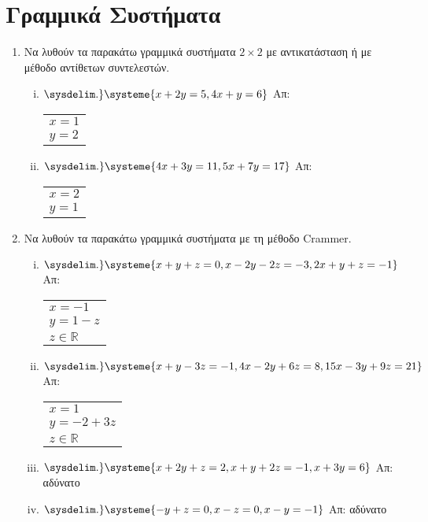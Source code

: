 


\usepackage{systeme}

\pagestyle{askhseis}


\setlength{\itemsep}{\baselineskip}




\section*{Γραμμικά Συστήματα}

\begin{enumerate}

  \item Να λυθούν τα παρακάτω γραμμικά συστήματα $ 2 \times 2 $ με αντικατάσταση ή με 
    μέθοδο αντίθετων συντελεστών.

    \begin{enumerate}[i)]
      \item $ 
      \sysdelim.\}
      \systeme{
        x + 2y = 5, 
        4x + y = 6
      } $ 
      \hfill Απ: 
      \begin{tabular}{l}  
        $x=1 $ \\ 
        $y=2 $ 
      \end{tabular}

    \item $ 
    \sysdelim.\}
    \systeme{
      4x+3y=11,
      5x+7y=17
    } $ 
    \hfill Απ: 
    \begin{tabular}{l}  
      $x=2 $ \\ 
      $y=1 $ 
    \end{tabular}
\end{enumerate}

  \item Να λυθούν τα παρακάτω γραμμικά συστήματα με τη μέθοδο Crammer.

    \begin{enumerate}[i)]
      \item $ 
      \sysdelim.\}
      \systeme{
        x+y+z=0,
        x-2y-2z=-3,
        2x+y+z=-1
      } $ 
      \hfill Απ: \begin{tabular}{l}  
        $x=-1 $ \\ 
        $ y=1-z $ \\
        $z \in \mathbb{R}  $
      \end{tabular}

    \item $ 
    \sysdelim.\}
    \systeme{
      x+y-3z=-1,
      4x-2y+6z=8,
      15x-3y+9z=21
    } $ 
    \hfill Απ: \begin{tabular}{l}  
      $x=1 $ \\ 
      $ y=-2+3z $ \\
      $z \in \mathbb{R}  $
    \end{tabular}

  \item $ 
  \sysdelim.\}
  \systeme{
    x+2y+z=2,
    x+y+2z=-1,
    x+3y=6
  } $ 
  \hfill Απ: αδύνατο 

\item $ 
\sysdelim.\}
\systeme{
  -y+z=0,
  x-z=0,
  x-y=-1
} $ 
\hfill Απ: αδύνατο 
\end{enumerate}
\end{enumerate}


